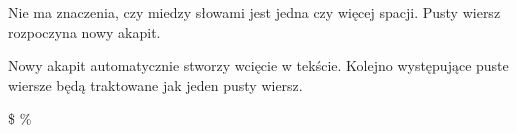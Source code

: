 \documentclass{article}
\begin{document}
    Nie ma znaczenia, czy miedzy słowami jest jedna czy         więcej spacji. Pusty wiersz rozpoczyna nowy akapit. 

Nowy akapit automatycznie stworzy wcięcie w tekście. Kolejno występujące puste wiersze będą traktowane jak jeden pusty wiersz.

\$ \% 
\end{document}
